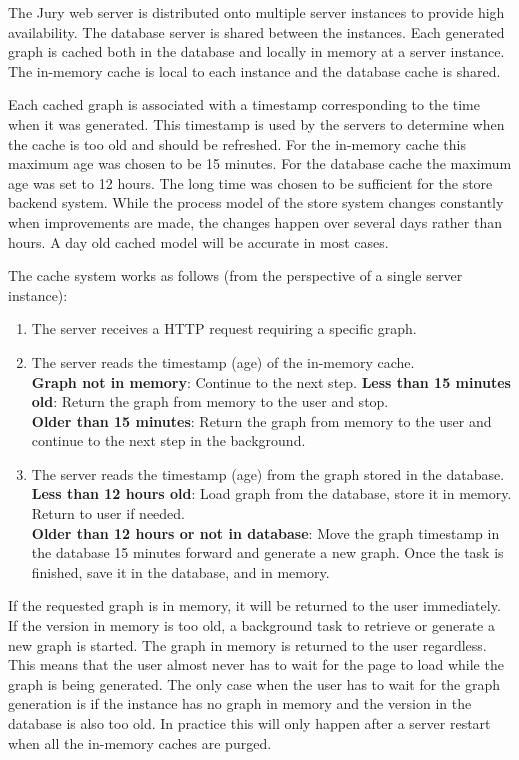 The Jury web server is distributed onto multiple server instances to provide high availability. The database server is shared between the instances.
Each generated graph is cached both in the database and locally in memory at a server instance.
The in-memory cache is local to each instance and the database cache is shared.

Each cached graph is associated with a timestamp corresponding to the time when it was generated. 
This timestamp is used by the servers to determine when the cache is too old and should be refreshed.
For the in-memory cache this maximum age was chosen to be 15 minutes.
For the database cache the maximum age was set to 12 hours.
The long time was chosen to be sufficient for the store backend system.
While the process model of the store system changes constantly when improvements are made, the changes happen over several days rather than hours. A day old cached model will be accurate in most cases.

The cache system works as follows (from the perspective of a single server instance):
\begin{enumerate}
    \item The server receives a HTTP request requiring a specific graph.
    \item The server reads the timestamp (age) of the in-memory cache. \\
    \textbf{Graph not in memory}: Continue to the next step.
    \textbf{Less than 15 minutes old}: Return the graph from memory to the user and stop. \\
    \textbf{Older than 15 minutes}: Return the graph from memory to the user and continue to the next step in the background.\\
    \item The server reads the timestamp (age) from the graph stored in the database.\\
    \textbf{Less than 12 hours old}: Load graph from the database, store it in memory. Return to user if needed.\\
    \textbf{Older than 12 hours or not in database}: Move the graph timestamp in the database 15 minutes forward and generate a new graph. Once the task is finished, save it in the database, and in memory.
\end{enumerate}

If the requested graph is in memory, it will be returned to the user immediately. 
If the version in memory is too old, a background task to retrieve or generate a new graph is started. 
The graph in memory is returned to the user regardless. 
This means that the user almost never has to wait for the page to load while the graph is being generated.
The only case when the user has to wait for the graph generation is if the instance has no graph in memory and the version in the database is also too old.
In practice this will only happen after a server restart when all the in-memory caches are purged.

